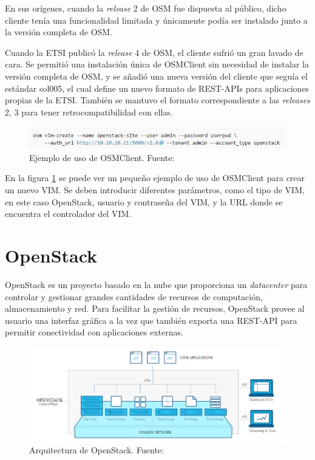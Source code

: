 En sus orígenes, cuando la \textit{release} 2 de \ac{OSM} fue dispuesta al público, dicho cliente tenía una funcionalidad limitada y únicamente podía ser instalado junto a la versión completa de \ac{OSM}.

Cuando la \ac{ETSI} publicó la \textit{release} 4 de \ac{OSM}, el cliente sufrió un gran lavado de cara. Se permitió una instalación única de OSMClient sin necesidad de instalar la versión completa de \ac{OSM}, y se añadió una nueva versión del cliente que seguía el estándar sol005\cite{sol005item}, el cual define un nuevo formato de REST-\acp{API} para aplicaciones propias de la \ac{ETSI}. También se mantuvo el formato correspondiente a las \textit{releases} 2, 3 para tener retrocompatibilidad con ellas.

\begin{figure}[!ht]
	\centering
	\includegraphics[width=0.9\linewidth]{imagenes/osmclientpython_example}
	\caption{Ejemplo de uso de OSMClient. Fuente:\cite{osmrel5bib}}
	\label{fig:osmclientpythonexample}
\end{figure}

En la figura \ref{fig:osmclientpythonexample} se puede ver un pequeño ejemplo de uso de OSMClient para crear un nuevo \ac{VIM}. Se deben introducir diferentes parámetros, como el tipo de \ac{VIM}, en este caso OpenStack, usuario y contraseña del \ac{VIM}, y la \ac{URL} donde se encuentra el controlador del \ac{VIM}.

\section{OpenStack}
\label{sec:openstack}

OpenStack\cite{openstackbib} es un proyecto basado en la nube que proporciona un \textit{datacenter} para controlar y gestionar grandes cantidades de recursos de computación, almacenamiento y red. Para facilitar la gestión de recursos, OpenStack provee al usuario una interfaz gráfica a la vez que también exporta una \ac{REST}-\ac{API} para permitir conectividad con aplicaciones externas.

\begin{figure}[!ht]
	\centering
	\includegraphics[width=0.9\linewidth]{imagenes/openstack_arch}
	\caption{Arquitectura de OpenStack. Fuente:\cite{openstackbib}}
	\label{fig:openstackarch}
\end{figure}

